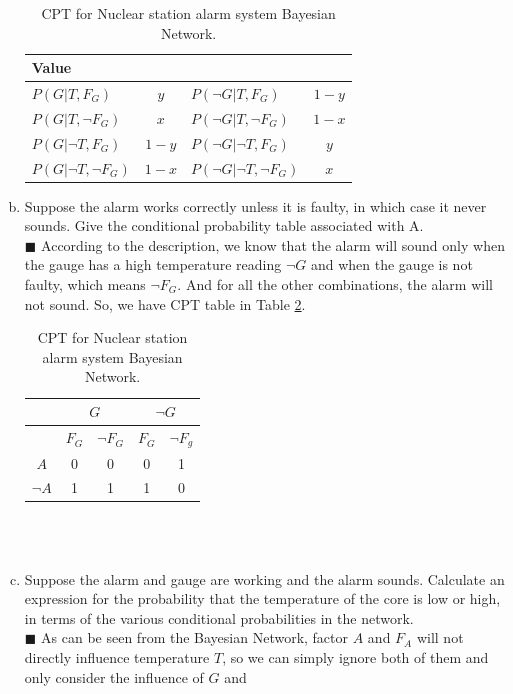 \documentclass{article}
\newcommand{\solution}[1]{~\\ $\blacksquare$ \sffamily\upshape\selectfont #1
\normalfont ~\\~ }
\begin{document}
\begin{enumerate}[a.]
{\begin{table}[h]
\begin{tabular}{lclc}
        \textbf{Value} \\ \toprule
        $P(G|T,F_G)$ & $y$ & $P(\neg G|T,F_G)$ & $1-y$ \\ \midrule
        $P(G|T,\neg F_G)$ & $x$ & $P(\neg G|T,\neg F_G)$ & $1-x$ \\ \midrule
        $P(G|\neg T,F_G)$ & $1-y$ & $P(\neg G|\neg T,F_G)$ & $y$ \\ \midrule
        $P(G|\neg T,\neg F_G)$ & $1-x$ & $P(\neg G|\neg T,\neg F_G)$ &
        $x$ \\ 
        \bottomrule
      \end{tabular}
      \caption{CPT for Nuclear station alarm system Bayesian Network.}
      \label{tbl:ai-hwk2-14-11.1}
    \end{table}
  }
\item Suppose the alarm works correctly unless it is faulty, in which
  case it never sounds.  Give the conditional probability table
  associated with A.
  \solution{According to the description, we know that the alarm will
    sound only when the gauge has a high temperature reading $\neg G$
    and when the gauge is not faulty, which means $\neg F_G$. And for
    all the other combinations, the alarm will not sound. 
    So, we have CPT table in Table \ref{tbl:ai-hwk2-14-11.2}.
    \begin{table}[h]
      \centering
      \begin{tabular}{ccccc}
        \toprule
        & \multicolumn{2}{c}{\textbf{$G$}} &
        \multicolumn{2}{c}{\textbf{$\neg G$}} \\ \toprule
        & $F_G$ & $\neg F_G$ & $F_G$ & $\neg F_g$ \\ \midrule 
        $A$ & 0 & 0 & 0 & 1 \\ \midrule 
        $\neg A$ & 1 & 1 & 1 & 0 \\
        \bottomrule
      \end{tabular}
      \caption{CPT for Nuclear station alarm system Bayesian Network.}
      \label{tbl:ai-hwk2-14-11.2}
    \end{table}
  }
\item Suppose the alarm and gauge are working and the alarm
  sounds. Calculate an expression for the probability that the
  temperature of the core is low or high, in terms of the various
  conditional probabilities in the network. 
  \solution{
    As can be seen from the Bayesian Network, factor $A$ and $F_A$
    will not directly influence temperature $T$, so we can simply
    ignore both of them and only consider the influence of $G$ and
}
\end{enumerate}
\end{document}

